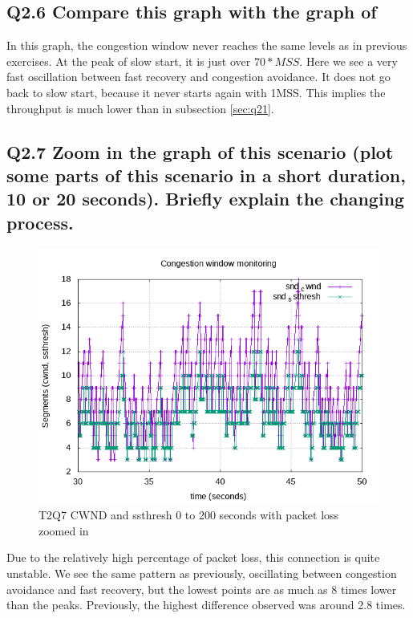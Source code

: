 \documentclass{article}
\begin{document}
\subsection{Q2.6 Compare this graph with the graph of}

In this graph, the congestion window never reaches the same levels as in
previous exercises. At the peak of slow start, it is just over $70*MSS$. Here
we see a very fast oscillation between fast recovery and congestion avoidance.
It does not go back to slow start, because it never starts again with 1MSS.
This implies the throughput is much lower than in subsection \ref{sec:q21}.


\subsection{Q2.7 Zoom in the graph of this scenario (plot some parts of this scenario in a short duration, 10 or 20 seconds). Briefly explain the changing process.}

\begin{figure}[H]
	\includegraphics{lab1-group1-task2-question7.png}
	\caption{T2Q7 CWND and ssthresh 0 to 200 seconds with packet loss zoomed in}
\end{figure}

Due to the relatively high percentage of packet loss, this connection is quite
unstable. We see the same pattern as previously, oscillating between congestion
avoidance and fast recovery, but the lowest points are as much as 8 times lower
than the peaks. Previously, the highest difference observed was around 2.8
times.
\end{document}
